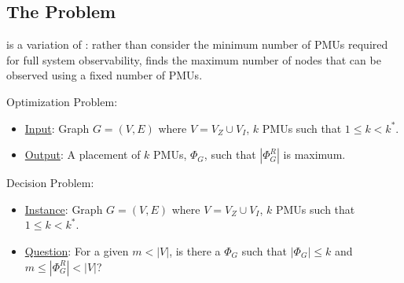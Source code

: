 \subsection{The \maxinc Problem}
\label{subsec:maxinc}

\maxinc is a variation of \fulls: rather than consider the minimum number of PMUs required for full system observability,
\maxinc finds the maximum number of nodes that can be observed using a fixed number of PMUs.


\maxinc Optimization Problem:
\begin{itemize}
	\item \underline{Input}: Graph $G=(V,E)$ where $V=V_Z \cup V_I$, $k$ PMUs such that $1 \leq k < k^*$.

	\item \underline{Output}: A placement of $k$ PMUs, $\Phi_G$, such that $|\Phi^R_G|$ is maximum.
\end{itemize}

\maxinc Decision Problem:
\begin{itemize}
	\item \underline{Instance}: Graph $G=(V,E)$ where $V=V_Z \cup V_I$, $k$ PMUs such that $1 \leq k < k^*$.

	\item \underline{Question}: For a given $m< |V|$, is there a $\Phi_G$ such that $|\Phi_G| \leq k$ and $m \leq |\Phi^R_G| < |V|$?
\end{itemize}



